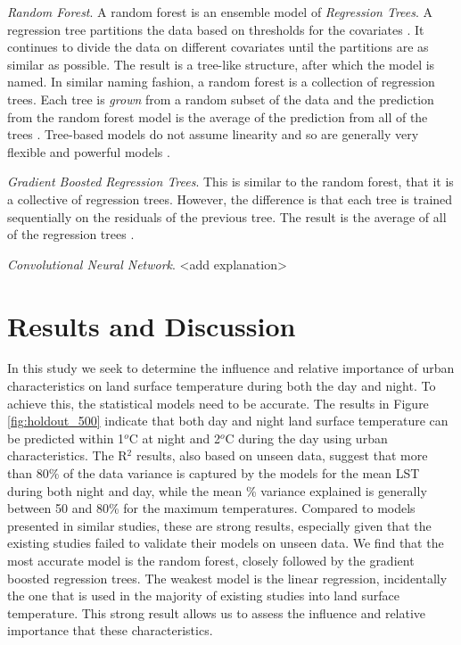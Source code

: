 \documentclass[final,3p,times,twocolumn,sort&compress]{elsarticle}
\begin{document}
\textit{Random Forest}. A random forest is an ensemble model of \textit{Regression Trees}. 
A regression tree partitions the data based on thresholds for the covariates \cite{Breiman1984-hw}. It continues to divide the data on different covariates until the partitions are as similar as possible. 
The result is a tree-like structure, after which the model is named.
In similar naming fashion, a random forest is a collection of regression trees.
Each tree is \textit{grown} from a random subset of the data and the prediction from the random forest model is the average of the prediction from all of the trees \cite{Breiman2001-rt}.
Tree-based models do not assume linearity and so are generally very flexible and powerful models \cite{Breiman2001-rt, Geron2017-ek}.

\textit{Gradient Boosted Regression Trees}. This is similar to the random forest, that it is a collective of regression trees. 
However, the difference is that each tree is trained sequentially on the residuals of the previous tree.
The result is the average of all of the regression trees \cite{Geron2017-ek}.

\textit{Convolutional Neural Network}. 
<add explanation>

\section{Results and Discussion}
In this study we seek to determine the influence and relative importance of urban characteristics on land surface temperature during both the day and night.
To achieve this, the statistical models need to be accurate.
The results in Figure \ref{fig:holdout_500} indicate that both day and night land surface temperature can be predicted within 1$^o$C at night and 2$^o$C during the day using urban characteristics.
The R$^2$ results, also based on unseen data, suggest that more than 80\% of the data variance is captured by the models for the mean LST during both night and day, while the mean \% variance explained is generally between 50 and 80\% for the maximum temperatures.
Compared to models presented in similar studies, these are strong results, especially given that the existing studies failed to validate their models on unseen data.
We find that the most accurate model is the random forest, closely followed by the gradient boosted regression trees.
The weakest model is the linear regression, incidentally the one that is used in the majority of existing studies into land surface temperature.
This strong result allows us to assess the influence and relative importance that these characteristics.
\end{document}
